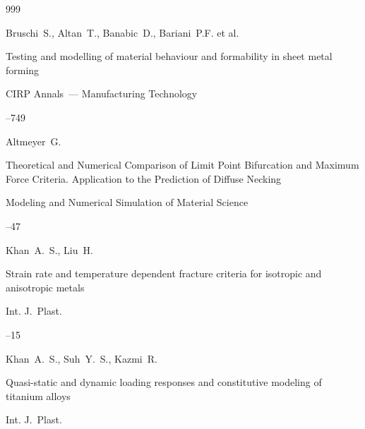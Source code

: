 \begin{thebibliography}{999}




\by Bruschi~S.,  Altan~T., Banabic~D., Bariani~P.F. et al.

\paper Testing and modelling of material behaviour and formability in sheet metal forming

\jour CIRP Annals~--- Manufacturing Technology




--749






\by  Altmeyer~G. 

\paper Theoretical and Numerical Comparison of Limit Point Bifurcation and Maximum Force Criteria. Application to the Prediction of Diffuse Necking  

\jour  Modeling and Numerical Simulation of Material Science




--47





\by Khan~A.~S., Liu~H. 

\paper Strain rate and temperature dependent fracture criteria for isotropic and anisotropic metals

\jour Int. J.~Plast.  



--15






\by Khan~A.~S., Suh~Y.~S., Kazmi~R. 

\paper Quasi-static and dynamic loading responses and constitutive modeling of titanium alloys

\jour Int. J.~Plast.  


\end{thebibliography}
